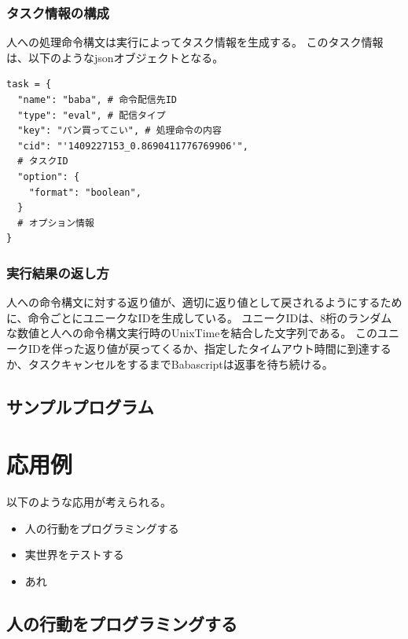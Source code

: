 \subsubsection{タスク情報の構成}\label{ux30bfux30b9ux30afux60c5ux5831ux306eux69cbux6210}

人への処理命令構文は実行によってタスク情報を生成する。
このタスク情報は、以下のようなjsonオブジェクトとなる。

\begin{verbatim}
task = {
  "name": "baba", # 命令配信先ID
  "type": "eval", # 配信タイプ
  "key": "パン買ってこい", # 処理命令の内容    
  "cid": "'1409227153_0.8690411776769906'", 
  # タスクID
  "option": {
    "format": "boolean",
  }
  # オプション情報
}
\end{verbatim}

\subsubsection{実行結果の返し方}\label{ux5b9fux884cux7d50ux679cux306eux8fd4ux3057ux65b9}

人への命令構文に対する返り値が、適切に返り値として戻されるようにするために、命令ごとにユニークなIDを生成している。
ユニークIDは、8桁のランダムな数値と人への命令構文実行時のUnixTimeを結合した文字列である。
このユニークIDを伴った返り値が戻ってくるか、指定したタイムアウト時間に到達するか、タスクキャンセルをするまでBabascriptは返事を待ち続ける。

\subsection{サンプルプログラム}\label{ux30b5ux30f3ux30d7ux30ebux30d7ux30edux30b0ux30e9ux30e0}

\section{応用例}\label{ux5fdcux7528ux4f8b}

以下のような応用が考えられる。

\begin{itemize}
  \item 人の行動をプログラミングする
  \item 実世界をテストする
  \item あれ
\end{itemize}

\subsection{人の行動をプログラミングする}\label{ux4ebaux306eux884cux52d5ux3092ux30d7ux30edux30b0ux30e9ux30dfux30f3ux30b0ux3059ux308b}

